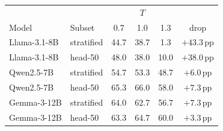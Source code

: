 \begin{tabular}{llcccc}
\toprule
 & & \multicolumn{3}{c}{$T$} & \\
Model & Subset & 0.7 & 1.0 & 1.3 & drop \\
\midrule
Llama-3.1-8B & stratified & 44.7 & 38.7 & 1.3 & $+43.3$\,pp \\
Llama-3.1-8B & head-50 & 48.0 & 38.0 & 10.0 & $+38.0$\,pp \\
\midrule
Qwen2.5-7B & stratified & 54.7 & 53.3 & 48.7 & $+6.0$\,pp \\
Qwen2.5-7B & head-50 & 65.3 & 66.0 & 58.0 & $+7.3$\,pp \\
\midrule
Gemma-3-12B & stratified & 64.0 & 62.7 & 56.7 & $+7.3$\,pp \\
Gemma-3-12B & head-50 & 63.3 & 64.7 & 60.0 & $+3.3$\,pp \\
\bottomrule
\end{tabular}
